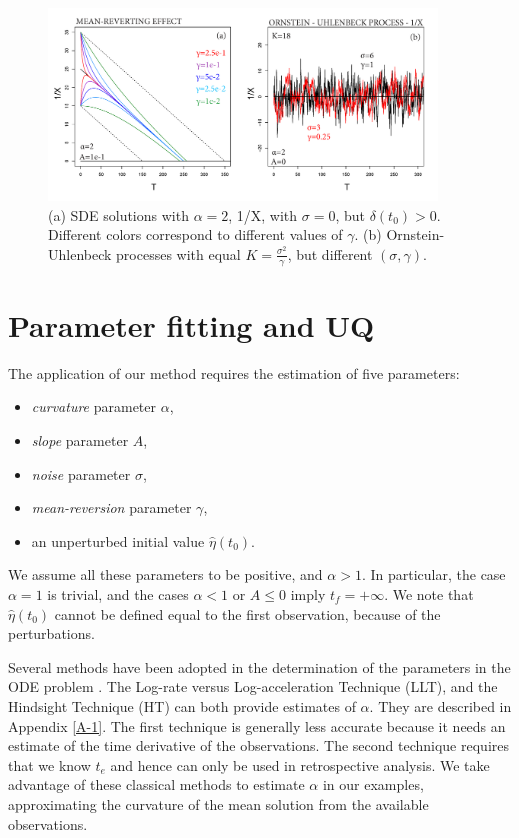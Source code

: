 \documentclass{article}
\begin{document}
\begin{figure}[H]
\centering
\includegraphics[width=0.92\textwidth]{Fig3_plus.png}
\caption{(a) SDE solutions with $\alpha=2$, 1/X, with $\sigma=0$, but $\delta(t_0)>0$. Different colors correspond to different values of $\gamma$. (b) Ornstein-Uhlenbeck processes with equal $K=\frac{\sigma^2}{\gamma}$, but different $(\sigma, \gamma)$.}
\label{Fig3}
\end{figure}

\section{Parameter fitting and UQ}
The application of our method requires the estimation of five parameters:
\begin{itemize}
  \item {\it curvature} parameter $\alpha$,
  \item {\it slope} parameter $A$,
  \item {\it noise} parameter $\sigma$,
  \item {\it mean-reversion} parameter $\gamma$,
  \item an unperturbed initial value $\hat\eta(t_0)$.
\end{itemize}
We assume all these parameters to be positive, and $\alpha > 1$. In particular, the case $\alpha=1$ is trivial, and the cases $\alpha <1$ or $A\le0$ imply $t_f=+\infty$. We note that $\hat\eta(t_0)$ cannot be defined equal to the first observation, because of the perturbations.

Several methods have been adopted in the determination of the parameters in the ODE problem \citep{Voight1988, Cornelius1995}. The Log-rate versus Log-acceleration Technique (LLT), and the Hindsight Technique (HT) can both provide estimates of $\alpha$. They are described in Appendix \ref{A-1}. The first technique is generally less accurate because it needs an estimate of the time derivative of the observations. The second technique requires that we know $t_e$ and hence can only be used in retrospective analysis. We take advantage of these classical methods to estimate $\alpha$ in our examples, approximating the curvature of the mean solution from the available observations.
\end{document}
